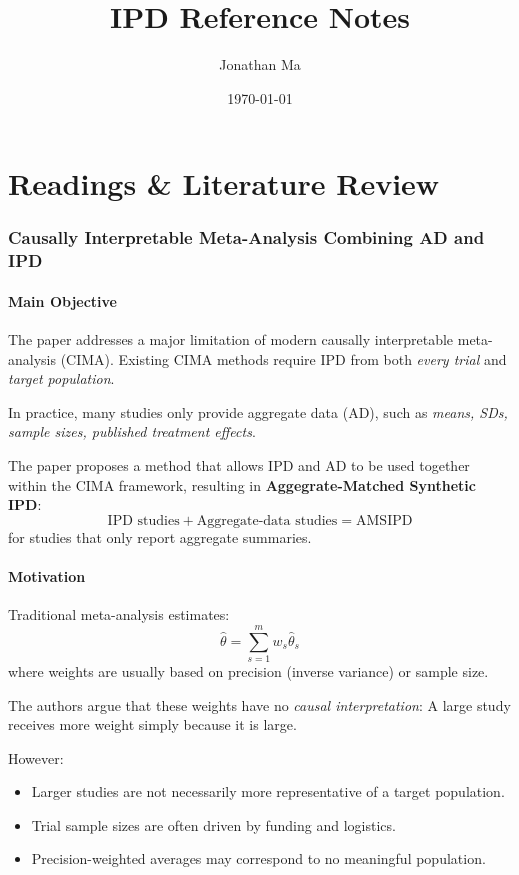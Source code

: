\documentclass[11pt]{article}
\title{\textbf{IPD Reference Notes}}
\author{Jonathan Ma}
\date{\today}
\begin{document}
\maketitle
\tableofcontents
\newpage

\part{Readings \& Literature Review}

\section{Causally Interpretable Meta-Analysis Combining AD and IPD}

\subsection*{Main Objective}

The paper addresses a major limitation of modern causally interpretable meta-analysis (CIMA).
Existing CIMA methods require IPD from both \emph{every trial} and \emph{target population}.

In practice, many studies only provide aggregate data (AD), such as \emph{means, SDs, sample sizes, published treatment effects}.

The paper proposes a method that allows IPD and AD to be used together within the CIMA framework, resulting in \textbf{Aggegrate-Matched Synthetic IPD}:
\[\text{IPD studies}+\text{Aggregate-data studies}=\text{AMSIPD}\]
for studies that only report aggregate summaries.

\subsection*{Motivation}

Traditional meta-analysis estimates:\[\hat{\theta}=\sum_{s=1}^{m}w_s \hat{\theta}_s\]where weights are usually based on precision (inverse variance) or sample size.

The authors argue that these weights have no \emph{causal interpretation}: A large study receives more weight simply because it is large.

However:
\begin{itemize}
    \item Larger studies are not necessarily more representative of a target population.
    \item Trial sample sizes are often driven by funding and logistics.
    \item Precision-weighted averages may correspond to no meaningful population.
\end{itemize}
\end{document}
